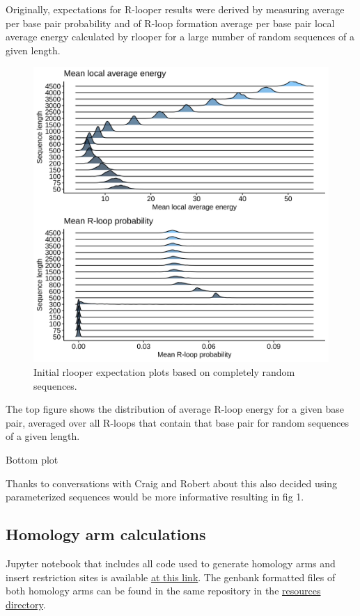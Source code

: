 \documentclass[11pt]{article}
\begin{document}
Originally, expectations for R-looper results were derived by measuring average per base pair probability and of R-loop formation average per base pair local average energy calculated by rlooper for a large number of random sequences of a given length. 

\begin{figure}[H]
	\includegraphics[width=15cm]{images/plots/rand_seq_LAE_dist.png}
	\centering
	\caption{Initial rlooper expectation plots based on completely random sequences.}
\end{figure}

The top figure shows the distribution of average R-loop energy for a given base pair, averaged over all R-loops that contain that base pair for random sequences of a given length.

Bottom plot

Thanks to conversations with Craig and Robert about this also decided using parameterized sequences would be more informative resulting in fig 1.




\subsection{Homology arm calculations}

Jupyter notebook that includes all code used to generate homology arms and insert
restriction sites is available  \href{https://github.com/EthanHolleman/plasmid-VR-design/blob/main/notes/homology_arms.ipynb}{at this link}. The genbank formatted files of both homology arms can be found in the same repository in the \href{https://github.com/EthanHolleman/plasmid-VR-design/tree/main/resources/files/genbank}{resources directory}.
\end{document}
